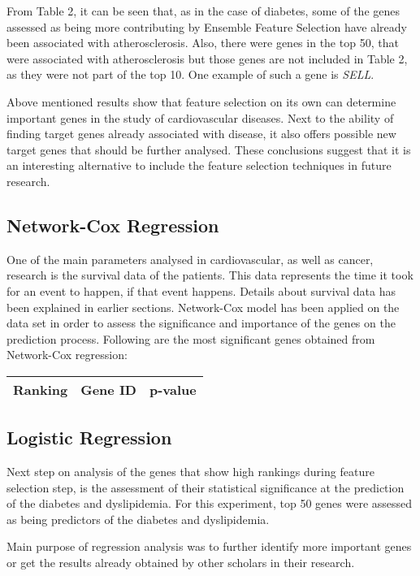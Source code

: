 \documentclass{ba-kecs}
\numberwithin{figure}{section}
\numberwithin{equation}{section}
\begin{document}
From Table 2, it can be seen that, as in the case of diabetes, some of the genes assessed as being more contributing by Ensemble Feature Selection have already been associated with atherosclerosis. Also, there were genes in the top 50, that were associated with atherosclerosis but those genes are not included in Table 2, as they were not part of the top 10. One example of such a gene is \textit{SELL}.

Above mentioned results show that feature selection on its own can determine important genes in the study of cardiovascular diseases. Next to the ability of finding target genes already associated with disease, it also offers possible new target genes that should be further analysed. These conclusions suggest that it is an interesting alternative to include the feature selection techniques in future research.

\subsection{Network-Cox Regression}

One of the main parameters analysed in cardiovascular, as well as cancer, research is the survival data of the patients. This data represents the time it took for an event to happen, if that event happens. Details about survival data has been explained in earlier sections. Network-Cox model has been applied on the data set in order to assess the significance and importance of the genes on the prediction process. Following are the most significant genes obtained from Network-Cox regression:
\begin{center}
\begin{tabular}{|l|l|l|}
\hline
Ranking & Gene ID & p-value \\ \hline

\end{tabular}
\end{center}

\subsection{Logistic Regression}

Next step on analysis of the genes that show high rankings during feature selection step, is the assessment of their statistical significance at the prediction of the diabetes and dyslipidemia. For this experiment, top 50 genes were assessed as being predictors of the diabetes and dyslipidemia.

Main purpose of regression analysis was to further identify more important genes or get the results already obtained by other scholars in their research.
\end{document}
